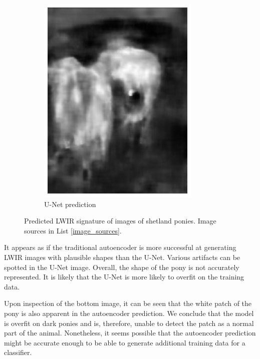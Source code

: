 \documentclass{l4proj}
\begin{document}
\begin{figure}[ht]
\begin{subfigure}[h!]{0.22\textwidth}
    \includegraphics[width=\textwidth]{images/autoencoder/pony_2/unet.png}
    \caption{U-Net prediction}
  \end{subfigure}
  \caption{Predicted LWIR signature of images of shetland ponies. Image sources in List \ref{image_sources}.}
  \label{fig:autoencoder_pony}
\end{figure}

It appears as if the traditional autoencoder is more successful at generating LWIR images with plausible shapes than the U-Net. Various artifacts can be spotted in the U-Net image. Overall, the shape of the pony is not accurately represented. It is likely that the U-Net is more likely to overfit on the training data.

Upon inspection of the bottom image, it can be seen that the white patch of the pony is also apparent in the autoencoder prediction. We conclude that the model is overfit on dark ponies and is, therefore, unable to detect the patch as a normal part of the animal. Nonetheless, it seems possible that the autoencoder prediction might be accurate enough to be able to generate additional training data for a classifier.
\end{document}
